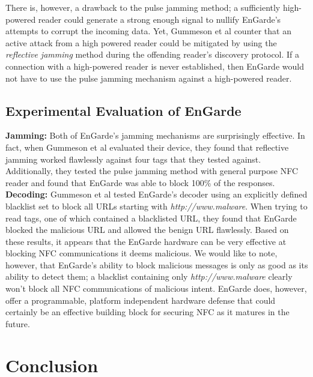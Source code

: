 \documentclass{sig-alternate}
\begin{document}
There is, however, a drawback to the pulse jamming method; a sufficiently high-powered reader could generate a strong enough signal to nullify EnGarde's attempts to corrupt the incoming data. Yet, Gummeson et al counter that an active attack from a high powered reader could be mitigated by using the \textit{reflective jamming} method during the offending reader's discovery protocol. If a connection with a high-powered reader is never established, then EnGarde would not have to use the pulse jamming mechanism against a high-powered reader.

\subsection{Experimental Evaluation of EnGarde}
\noindent\textbf{Jamming:} Both of EnGarde's jamming mechanisms are surprisingly effective. In fact, when Gummeson et al evaluated their device, they found that reflective jamming worked flawlessly against four tags that they tested against. Additionally, they tested the pulse jamming method with general purpose NFC reader and found that EnGarde was able to block 100\% of the responses.
\vspace{2mm}\newline
\noindent\textbf{Decoding:}
Gummeson et al tested EnGarde's decoder using an explicitly defined blacklist set to block all URLs starting with \textit{http://www.malware}. When trying to read tags, one of which contained a blacklisted URL, they found that EnGarde blocked the malicious URL and allowed the benign URL flawlessly.
\vspace{2mm}\newline
Based on these results, it appears that the EnGarde hardware can be very effective at blocking NFC communications it deems malicious. We would like to note, however, that EnGarde's ability to block malicious messages is only as good as its ability to detect them; a blacklist containing only \textit{http://www.malware} clearly won't block all NFC communications of malicious intent. EnGarde does, however, offer a  programmable, platform independent hardware defense that could certainly be an effective building block for securing NFC as it matures in the future.
\section{Conclusion}
\label{sec:conclusions}
\end{document}
